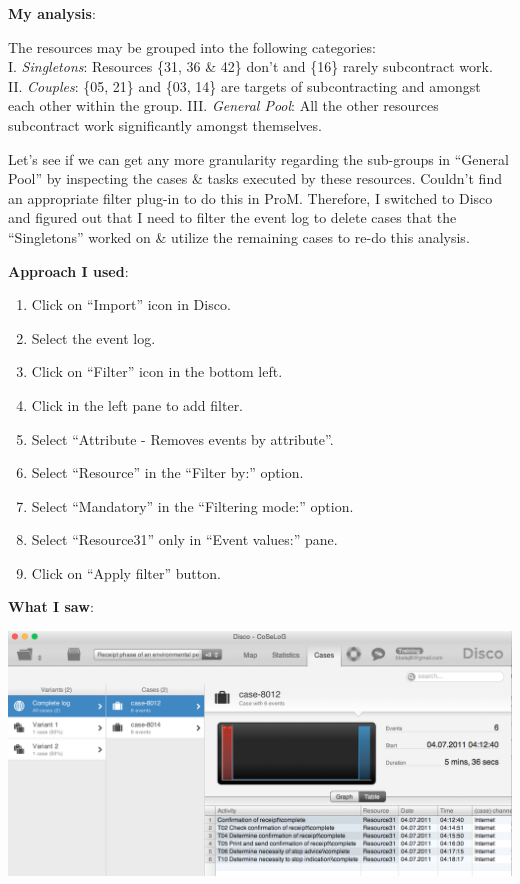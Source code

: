 \documentclass[]{article}
\begin{document}
\textbf{My analysis}:

The resources may be grouped into the following categories:\\I.
\emph{Singletons}: Resources \{31, 36 \& 42\} don't and \{16\} rarely
subcontract work.\\II. \emph{Couples}: \{05, 21\} and \{03, 14\} are
targets of subcontracting and amongst each other within the group. III.
\emph{General Pool}: All the other resources subcontract work
significantly amongst themselves.

Let's see if we can get any more granularity regarding the sub-groups in
``General Pool'' by inspecting the cases \& tasks executed by these
resources. Couldn't find an appropriate filter plug-in to do this in
ProM. Therefore, I switched to Disco and figured out that I need to
filter the event log to delete cases that the ``Singletons'' worked on
\& utilize the remaining cases to re-do this analysis.

\textbf{Approach I used}:

\begin{enumerate}
\def\labelenumi{\arabic{enumi}.}
\setcounter{enumi}{10}
\itemsep1pt\parskip0pt
\item
  Click on ``Import'' icon in Disco.\\
\item
  Select the event log.\\
\item
  Click on ``Filter'' icon in the bottom left.\\
\item
  Click in the left pane to add filter.\\
\item
  Select ``Attribute - Removes events by attribute''.\\
\item
  Select ``Resource'' in the ``Filter by:'' option.\\
\item
  Select ``Mandatory'' in the ``Filtering mode:'' option.
\item
  Select ``Resource31'' only in ``Event values:'' pane.
\item
  Click on ``Apply filter'' button.
\end{enumerate}

\textbf{What I saw}:

\includegraphics{CoSeLog_Step07_Filter_Resource31.png}
\end{document}
